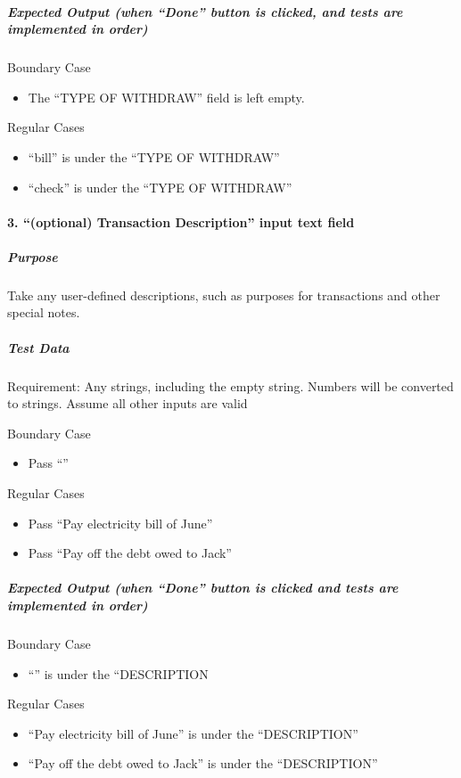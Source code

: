 \documentclass[12pt]{article}
\begin{document}
\subparagraph{Expected Output (when “Done” button is clicked, and tests are implemented in order)}

Boundary Case
\begin{itemize}
  \item The “TYPE OF WITHDRAW” field is left empty.
\end{itemize}

Regular Cases
\begin{itemize}
  \item “bill” is under the “TYPE OF WITHDRAW”
  \item “check” is under the “TYPE OF WITHDRAW” 
\end{itemize}

\paragraph{3. “(optional) Transaction Description” input text field}
 
\subparagraph{Purpose} Take any user-defined descriptions, such as purposes for transactions and other special notes.
 
\subparagraph{Test Data} Requirement: Any strings, including the empty string. Numbers will be converted to strings. Assume all other inputs are valid
 
Boundary Case
\begin{itemize}
  \item Pass “”
  \end{itemize}

Regular Cases
\begin{itemize}
  \item Pass “Pay electricity bill of June”
  \item Pass “Pay off the debt owed to Jack”
 \end{itemize}
 
\subparagraph{Expected Output (when “Done” button is clicked and tests are implemented in order)}
 
Boundary Case
\begin{itemize}
  \item “” is under the “DESCRIPTION
\end{itemize}

Regular Cases
\begin{itemize}
  \item “Pay electricity bill of June” is under the “DESCRIPTION” 
  \item “Pay off the debt owed to Jack” is under the “DESCRIPTION”
 \end{itemize}
\end{document}
